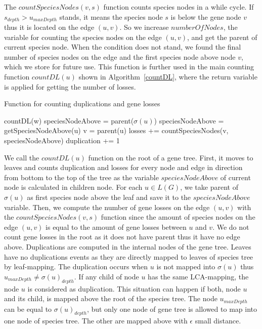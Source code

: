 The $countSpeciesNodes(v, s)$ function counts species nodes in a while cycle. If $s_{depth} > u_{maxDepth}$ stands, it means the species node $s$ is below the gene node $v$ thus it is located on the edge $(u, v)$. So we increase $numberOfNodes$, the variable for counting the species nodes on the edge $(u, v)$, and get the parent of current species node. When the condition does not stand, we found the final number of species nodes on the edge and the first species node above node $v$, which we store for future use. This function is further used in the main counting function $countDL(u)$ shown in Algorithm~\ref{countDL}, where the return variable is applied for getting the number of losses.

\begin{algorithm}
\caption{Function for counting duplications and gene losses} 
\label{countDL}
\begin{algorithmic}[1]
		\State countDL(w)
	\EndFor
		\State speciesNodeAbove = parent($\sigma(u)$)
	\Else
		\State speciesNodeAbove = getSpeciesNodeAbove(u)
	\EndIf
		\State v = parent(u)
		\State losses += countSpeciesNodes(v, speciesNodeAbove)
	\EndIf
		\State duplication += 1
	\EndIf
\EndFunction
\end{algorithmic}
\end{algorithm}

We call the $countDL(u)$ function on the root of a gene tree. First, it moves to leaves and counts duplication and losses for every node and edge in direction from bottom to the top of the tree as the variable $speciesNodeAbove$ of current node is calculated in children node. For each $u \in L(G)$, we take parent of $\sigma(u)$ as first species node above the leaf and save it to the $speciesNodeAbove$ variable. Then, we compute the number of gene losses on the edge $(u, v)$ with the $countSpeciesNodes(v, s)$ function since the amount of species nodes on the edge $(u, v)$ is equal to the amount of gene losses between $u$ and $v$. We do not count gene losses in the root as it does not have parent thus it have no edge above. Duplications are computed in the internal nodes of the gene tree. Leaves have no duplications events as they are directly mapped to leaves of species tree by leaf-mapping. The duplication occurs when $u$ is not mapped into $\sigma(u)$ thus $u_{maxDepth} \ne \sigma(u)_{depth}$. If any child of node $u$ has the same LCA-mapping, the node $u$ is considered as duplication. This situation can happen if both, node $u$ and its child, is mapped above the root of the species tree. The node $u_{maxDepth}$ can be equal to $\sigma(u)_{depth}$, but only one node of gene tree is allowed to map into one node of species tree. The other are mapped above with $\epsilon$ small distance.

